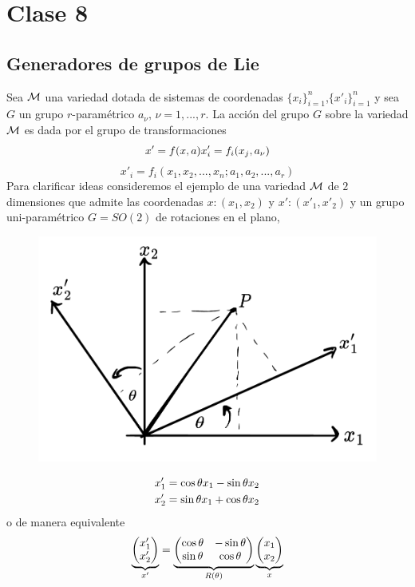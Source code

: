 \section{Clase 8}
\subsection{Generadores de grupos de Lie}
Sea $\mathcal{M}$ una variedad dotada de  sistemas de coordenadas $\{x_i\}_{i=1}^n$,$\{x'_i\}_{i=1}^n$ y sea $G$ un grupo $r$-paramétrico $a_\nu,\, \nu=1,...,r$. La acción del grupo $G$ sobre la variedad $\mathcal{M}$ es dada por el grupo de transformaciones 
\begin{equation}
  x'=f(x,a)  x'_i=f_i(x_j,a_\nu )
\end{equation}
\begin{equation}
  x'_i=f_i(x_1,x_2,...,x_n; a_1,a_2,...,a_r)
\end{equation}
Para clarificar ideas consideremos el ejemplo de una variedad $\mathcal{M}$ de $2$ dimensiones que admite las coordenadas $x:(x_1,x_2)$ y $x':(x'_1,x'_2)$ y un grupo uni-paramétrico $G=SO(2)$ de rotaciones en el plano,

\begin{figure}[h!]
	\centering
	\includegraphics[scale=0.5]{fig/sistema-coord.pdf}
\end{figure}

\begin{align}
  x'_1&=\cos\theta x_1-\sin\theta x_2\\
  x'_2&=\sin\theta x_1+\cos\theta x_2
\end{align}
o de manera equivalente
\begin{equation}
  \underbrace{\mqty(x_1'\\x'_2)}_{x'}=\underbrace{\mqty(\cos\th&-\sin\th\\\sin\th&\cos\th)}_{R(\th)}\underbrace{\mqty(x_1\\x_2)}_{x}
\end{equation}


